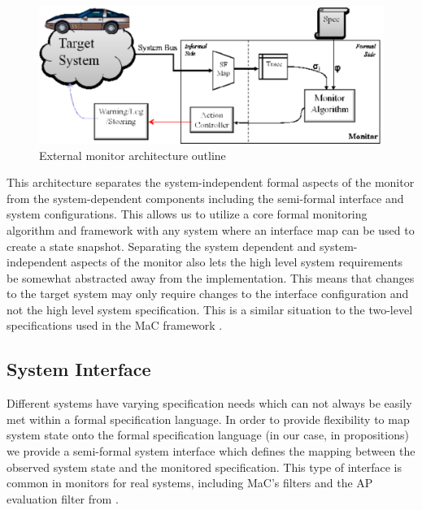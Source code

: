 
\begin{figure}
\includegraphics[width=4.5in]{img/mon_arch}
\caption{External monitor architecture outline \label{fig:architecture}}
\end{figure}

This architecture separates the system-independent formal aspects of the monitor from the system-dependent components including the semi-formal interface and system configurations. 
This allows us to utilize a core formal monitoring algorithm and framework with any system where an interface map can be used to create a state snapshot. 
Separating the system dependent and system-independent aspects of the monitor also lets the high level system requirements be somewhat abstracted away from the implementation. This means that changes to the target system may only require changes to the interface configuration and not the high level system specification. This is a similar situation to the two-level specifications used in the MaC framework \cite{Kim2004}.

\subsection{System Interface}
Different systems have varying specification needs which can not always be easily met within a formal specification language. In order to provide flexibility to map system state onto the formal specification language (in our case, in propositions) we provide a semi-formal system interface which defines the mapping between the observed system state and the monitored specification. This type of interface is common in monitors for real systems, including MaC's filters \cite{Kim2004} and the AP evaluation filter from \cite{Heffernan2014}.

